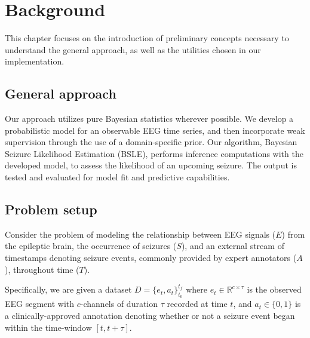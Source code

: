 \chapter{Background}
\label{ch:background}
This chapter focuses on the introduction of preliminary concepts necessary to understand the general approach, as well as the utilities chosen in our implementation.

\section{General approach}
\label{sec:2background:approach}
Our approach utilizes pure Bayesian statistics wherever possible. We develop a probabilistic model for an observable EEG time series, and then incorporate weak supervision through the use of a domain-specific prior. Our algorithm, Bayesian Seizure Likelihood Estimation (BSLE), performs inference computations with the developed model, to assess the likelihood of an upcoming seizure. The output is tested and evaluated for model fit and predictive capabilities.





\section{Problem setup}
\label{sec:2background:setup}
Consider the problem of modeling the relationship between EEG signals ($E$) from the epileptic brain, the occurrence of seizures ($S$), and an external stream of timestamps denoting seizure events, commonly provided by expert annotators ($A$), throughout time ($T$).

Specifically, we are given a dataset $D = \{e_t, a_t\}_{t_0}^{t_f}$ where $e_t \in \mathbb{R}^{c \times \tau}$ is the observed EEG segment with $c$-channels of duration $\tau$ recorded at time $t$, and $a_t \in \{0, 1\}$ is a clinically-approved annotation denoting whether or not a seizure event began within the time-window $[t, t + \tau ]$.

